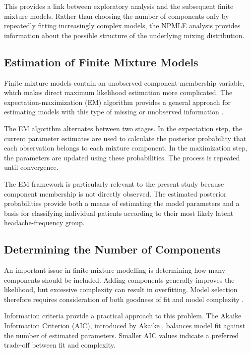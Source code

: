 This provides a link between exploratory analysis and the subsequent
finite mixture models. Rather than choosing the number of components
only by repeatedly fitting increasingly complex models, the NPMLE
analysis provides information about the possible structure of the
underlying mixing distribution.


\subsection{Estimation of Finite Mixture Models}

Finite mixture models contain an unobserved component-membership
variable, which makes direct maximum likelihood estimation more
complicated. The expectation-maximization (EM) algorithm provides a
general approach for estimating models with this type of missing or
unobserved information \citep{McLachlanPeel2000}.

The EM algorithm alternates between two stages. In the expectation
step, the current parameter estimates are used to calculate the
posterior probability that each observation belongs to each mixture
component. In the maximization step, the parameters are updated using
these probabilities. The process is repeated until convergence.

The EM framework is particularly relevant to the present study because
component membership is not directly observed. The estimated
posterior probabilities provide both a means of estimating the model
parameters and a basis for classifying individual patients according
to their most likely latent headache-frequency group.


\subsection{Determining the Number of Components}

An important issue in finite mixture modelling is determining how many
components should be included. Adding components generally improves
the likelihood, but excessive complexity can result in overfitting.
Model selection therefore requires consideration of both goodness of
fit and model complexity \citep{McLachlanPeel2000}.

Information criteria provide a practical approach to this problem.
The Akaike Information Criterion (AIC), introduced by Akaike
\citep{Akaike1974}, balances model fit against the number of estimated
parameters. Smaller AIC values indicate a preferred trade-off
between fit and complexity.


